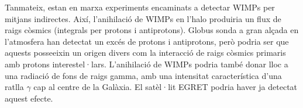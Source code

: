 Tanmateix, estan en marxa experiments encaminats a detectar WIMPs per mitjans indirectes. Així, l'anihilació de WIMPs en l'halo produiria un flux de raigs còsmics (integrals per protons i antiprotons). Globus sonda a gran alçada en l'atmosfera han detectat un excés de protons i antiprotons, però podria ser que aquests posseeixin un origen divers com la interacció de raigs còsmics primaris amb protons interestel·lars. L'anihilació de WIMPs podria també donar lloc a una radiació de fons de raigs gamma, amb una intensitat característica d'una ratlla $\gamma$ cap al centre de la Galàxia. El satèl·lit EGRET podria haver ja detectat aquest efecte.
